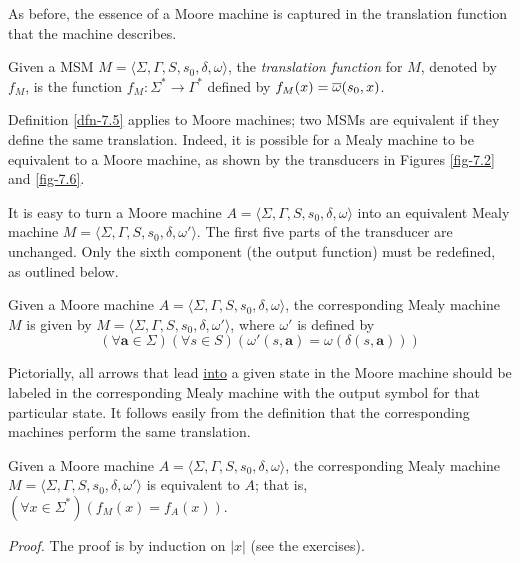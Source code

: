 As before, the essence of a Moore machine is captured in the translation
function that the machine describes.

\begin{dfn}\label{dfn-7.18}{}
Given a MSM $M=\langle\Sigma,\Gamma,S,s_0,\delta,\omega\rangle$, the
\emph{translation function} for $M$, denoted by $f_M$, is the function
$f_M$$: \Sigma^* \rightarrow \Gamma^*$ defined by $f_M(x)=\overline{\omega}(s_0,x)$.
\end{dfn}

Definition \ref{dfn-7.5} applies to Moore machines; two MSMs are equivalent if they
define the same translation. Indeed, it is possible for a Mealy machine to be
equivalent to a Moore machine, as shown by the transducers in Figures
\ref{fig-7.2} and \ref{fig-7.6}.

It is easy to turn a Moore machine $A=\langle\Sigma,\Gamma,S,s_0,\delta,\omega
\rangle$ into an equivalent Mealy machine $M=\langle\Sigma,\Gamma,S,s_0,\delta,
\omega'\rangle$. The first five parts of the transducer are unchanged. Only the
sixth component (the output function) must be redefined, as outlined below.

\begin{dfn}\label{dfn-7.19}
Given a Moore machine $A=\langle\Sigma,\Gamma,S,s_0,\delta,\omega\rangle$, the
corresponding Mealy machine $M$ is given by $M=\langle\Sigma,\Gamma,S,s_0,
\delta,\omega'\rangle$, where $\omega'$ is defined by
\[ (\forall \pmb{a} \in \Sigma)(\forall s \in S)(\omega'(s,\pmb{a})=
	\omega(\delta(s,\pmb{a}))) \]
\end{dfn}

Pictorially, all arrows that lead \underline{into} a given state in the Moore machine should
be labeled in the corresponding Mealy machine with the output symbol for that
particular state. It follows easily from the definition that the corresponding
machines perform the same translation.

\begin{thm}\label{thm-7.7}
Given a Moore machine $A=\langle\Sigma,\Gamma,S,s_0,\delta,\omega\rangle$, the
corresponding Mealy machine\linebreak$M=\langle\Sigma,\Gamma,S,s_0,\delta,\omega'\rangle$
is equivalent to $A$; that is, $(\forall x \in \Sigma^*)(f_M(x)=f_A(x))$.

\emph{Proof.} The proof is by induction on $|x|$ (see the exercises).
\end{thm}

